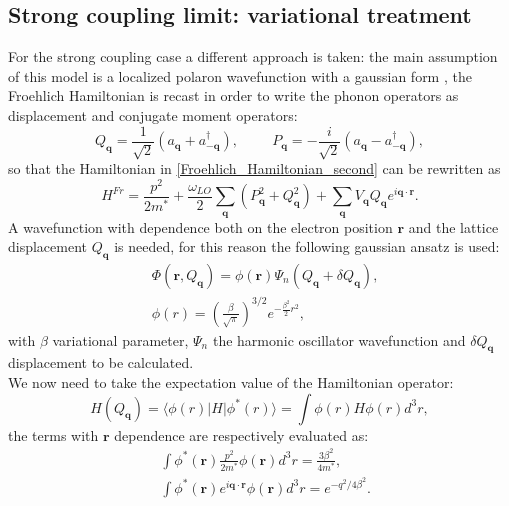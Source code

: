 \documentclass[12pt, a4paper]{report}
\numberwithin{equation}{section}
\begin{document}
\subsection{Strong coupling limit: variational treatment}
For the strong coupling case a different approach is taken: the main assumption of this model is a localized polaron wavefunction with 
a gaussian form \cite{mahan2013many}, the Froehlich Hamiltonian is recast in order to write the phonon operators as displacement and 
conjugate moment operators:
\begin{equation}
    Q_\mathbf{q}=\frac{1}{\sqrt{2}}\left(a_\mathbf{q}+a^\dagger_{-\mathbf{q}}\right),\hspace{1cm}P_\mathbf{q}=-\frac{i}{\sqrt{2}}\left(a_\mathbf{q}-a^\dagger_{-\mathbf{q}}\right),
\end{equation}
so that the Hamiltonian in \ref{Froehlich_Hamiltonian_second} can be rewritten as
\begin{equation}
    H^{Fr}=\frac{p^2}{2m^*}+\frac{\omega_{LO}}{2}\sum_{\mathbf{q}}\left(P^2_\mathbf{q}+Q^2_\mathbf{q}\right)+\sum_\mathbf{q}V_\mathbf{q}Q_\mathbf{q}e^{i\mathbf{q}\cdot\mathbf{r}}.
\end{equation}
A wavefunction with dependence both on the electron position $\mathbf{r}$ and the lattice displacement $Q_\mathbf{q}$ is needed, for 
this reason the following gaussian ansatz is used:
\begin{equation}
\begin{split}
    &\Phi(\mathbf{r},Q_\mathbf{q})=\phi(\mathbf{r})\Psi_n(Q_\mathbf{q}+\delta Q_\mathbf{q}),\\
    &\phi(r)=\left(\frac{\beta}{\sqrt{\pi}}\right)^{3/2}e^{-\frac{\beta^2}{2}r^2},
\end{split}
\end{equation}
with $\beta$ variational parameter, $\Psi_n$ the harmonic oscillator wavefunction and $\delta Q_\mathbf{q}$ displacement to be 
calculated.\\
We now need to take the expectation value of the Hamiltonian operator:
\begin{equation}
    H(Q_\mathbf{q})=\langle \phi(r)|H|\phi^*(r)\rangle=\int \phi(r)H\phi(r)d^3r,
\end{equation}
the terms with $\mathbf{r}$ dependence are respectively evaluated as:
\begin{equation}
\begin{split}
    &\int\phi^*(\mathbf{r})\frac{p^2}{2m^*}\phi(\mathbf{r})d^3r=\frac{3\beta^2}{4m^*},\\
    &\int \phi^*(\mathbf{r})e^{i\mathbf{q}\cdot\mathbf{r}}\phi(\mathbf{r})d^3r=e^{-q^2/4\beta^2}.
\end{split}
\end{equation}
\end{document}
